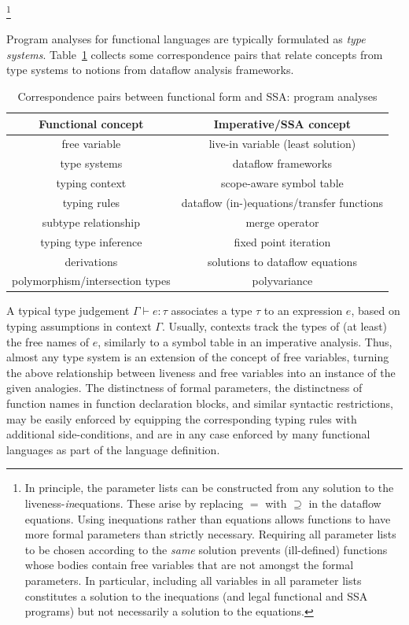 \footnote{In principle, the parameter lists can be
constructed from any solution to the
liveness-\emph{in}equations. These arise by replacing $=$ with
$\supseteq$ in the dataflow equations. Using inequations rather than
equations allows functions to have more formal parameters than
strictly necessary. Requiring all parameter lists to be chosen
according to the
\emph{same} solution prevents (ill-defined) functions whose bodies contain free
variables that are not amongst the formal parameters.  In particular,
including all variables in all parameter lists constitutes a solution
to the inequations (and legal functional and SSA programs) but not
necessarily a solution to the equations.}

Program analyses for functional languages are typically formulated as
\emph{type systems}. Table~\ref{tableFunctionalCorrespondencesII} collects some
correspondence pairs that relate concepts from type systems to notions
from dataflow analysis frameworks.
\begin{table}
\begin{center}
\begin{tabular}{|c|c|}
  \hline Functional concept & Imperative/SSA concept\\ 
  \hline 
  free variable & live-in variable (least solution)\\
  type systems & dataflow frameworks\\
  typing context & scope-aware symbol table\\
  typing
  rules & dataflow (in-)equations/transfer functions\\
  subtype relationship & merge operator\\
  typing
  type inference & fixed point iteration\\
  derivations & solutions to dataflow equations\\
  polymorphism/intersection types & polyvariance\\
  \hline
\end{tabular}
\end{center}
\caption{\label{tableFunctionalCorrespondencesII}
  Correspondence pairs between functional form and SSA: program analyses}
\end{table}
 A typical type judgement $\Gamma
\vdash e:\tau$ 
associates a type $\tau$ to an expression $e$, based on typing
assumptions in context $\Gamma$. Usually, contexts track the types of
(at least) the free names of $e$, similarly to a symbol table in an
imperative analysis. Thus, almost any type system is an extension of
the concept of free variables, turning the above relationship between
liveness and free variables into an instance of the given
analogies. The distinctness of formal parameters, the distinctness of
function names in function declaration blocks, and similar syntactic
restrictions, may be easily enforced by equipping the corresponding
typing rules with additional side-conditions, and are in any case
enforced by many functional languages as part of the language
definition.

